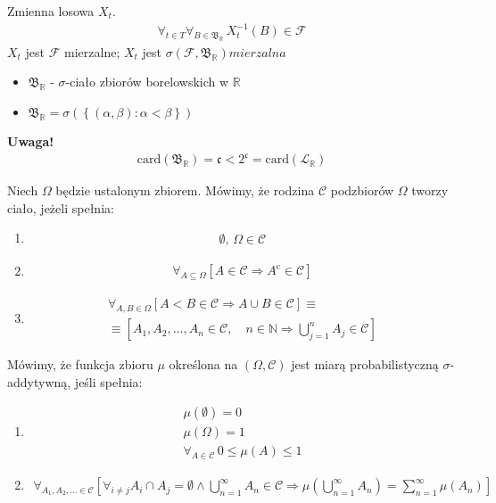 \begin{defi}
Zmienna losowa $ X_t $.
\begin{gather*}
\forall_{t\in T}\forall_{B\in \mathfrak B_\mathbb R}\,
X_t^{-1}(B)\in \mathcal F 
\end{gather*}
$ X_t $ jest $ \mathcal F  $ mierzalne; $ X_t $ jest $ \sigma (\mathcal F ,\mathfrak B_\mathbb R) mierzalna $
\begin{itemize}
\item $ \mathfrak B_\mathbb R $ - $ \sigma $-ciało zbiorów borelowskich w $ \mathbb R  $
\item $ \mathfrak B_\mathbb R=\sigma\left(\left\{\left(\alpha,\beta\right):\alpha<\beta\right\}\right) $
\end{itemize}
\end{defi}
\textbf{Uwaga!}\\
\begin{gather*}
\text{card}(\mathfrak B_\mathbb R)=\mathfrak c<2^\mathfrak c=\text{card}\left(\mathcal L_\mathbb R \right)
\end{gather*}
\begin{defi}
Niech $ \Omega $ będzie ustalonym zbiorem. Mówimy, że rodzina $ \mathcal C $ podzbiorów $ \Omega $ tworzy ciało, jeżeli spełnia:
\begin{enumerate}
\item 
\begin{gather*}
\emptyset,\,\Omega\in\mathcal C
\end{gather*}
\item 
\begin{gather*}
\forall_{A\subseteq\Omega}
\left[A\in\mathcal C\Rightarrow A^\mathrm c\in\mathcal C\right]
\end{gather*}
\item 
\begin{gather*}
\forall_{A,B\in\Omega}
\left[A<B\in\mathcal C\Rightarrow A\cup B\in\mathcal C\right]
\equiv\\
\equiv
\left[A_1,A_2,\dots,A_n\in\mathcal C,\quad n\in \mathbb{N}\Rightarrow \bigcup_{j=1}^n A_j\in \mathcal C\right]
\end{gather*}
\end{enumerate}
\end{defi}
\begin{defi}
Mówimy, że funkcja zbioru $ \mu $ określona na $ (\Omega,\mathcal C ) $ jest miarą probabilistyczną $ \sigma
$-addytywną, jeśli spełnia:
\begin{enumerate}
\item 
\begin{gather*}
\mu(\emptyset)=0\\
\mu(\Omega)=1\\
\forall_{A\in \mathcal C }\,
0\le\mu(A)\le1
\end{gather*}
\item 
\begin{gather*}
\forall_{A_1,A_2,\ldots\in \mathcal C }
\left[\forall_{i\neq j}A_i\cap A_j=\emptyset\wedge \bigcup_{n=1}^\infty A_n \in \mathcal C  \Rightarrow \mu\left(\bigcup_{n=1}^\infty A_n\right)=\sum_{n=1}^{\infty }\mu\left(A_n\right)\right]
\end{gather*}
\end{enumerate}
\end{defi}